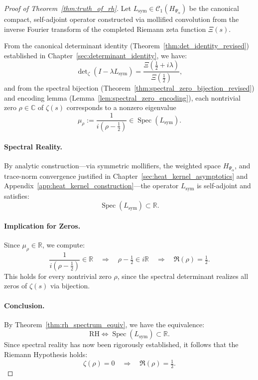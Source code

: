 \begin{proof}[Proof of Theorem~\ref{thm:truth_of_rh}]
Let \( L_{\mathrm{sym}} \in \mathcal{C}_1(H_{\Psi_\alpha}) \) be the canonical compact, self-adjoint operator constructed via mollified convolution from the inverse Fourier transform of the completed Riemann zeta function \( \Xi(s) \).

From the canonical determinant identity (Theorem~\ref{thm:det_identity_revised}) established in Chapter~\ref{sec:determinant_identity}, we have:
\[
\det\nolimits_\zeta(I - \lambda L_{\mathrm{sym}}) = \frac{\Xi\left( \tfrac{1}{2} + i\lambda \right)}{\Xi\left( \tfrac{1}{2} \right)},
\]
and from the spectral bijection (Theorem~\ref{thm:spectral_zero_bijection_revised}) and encoding lemma (Lemma~\ref{lem:spectral_zero_encoding}), each nontrivial zero \( \rho \in \mathbb{C} \) of \( \zeta(s) \) corresponds to a nonzero eigenvalue
\[
\mu_\rho := \frac{1}{i(\rho - \tfrac{1}{2})} \in \operatorname{Spec}(L_{\mathrm{sym}}).
\]

\paragraph{Spectral Reality.}
By analytic construction—via symmetric mollifiers, the weighted space \( H_{\Psi_\alpha} \), and trace-norm convergence justified in Chapter~\ref{sec:heat_kernel_asymptotics} and Appendix~\ref{app:heat_kernel_construction}—the operator \( L_{\mathrm{sym}} \) is self-adjoint and satisfies:
\[
\operatorname{Spec}(L_{\mathrm{sym}}) \subset \mathbb{R}.
\]

\paragraph{Implication for Zeros.}
Since \( \mu_\rho \in \mathbb{R} \), we compute:
\[
\frac{1}{i(\rho - \tfrac{1}{2})} \in \mathbb{R}
\quad \Longrightarrow \quad \rho - \tfrac{1}{2} \in i\mathbb{R}
\quad \Longrightarrow \quad \Re(\rho) = \tfrac{1}{2}.
\]
This holds for every nontrivial zero \( \rho \), since the spectral determinant realizes all zeros of \( \zeta(s) \) via bijection.

\paragraph{Conclusion.}
By Theorem~\ref{thm:rh_spectrum_equiv}, we have the equivalence:
\[
\mathrm{RH} \iff \operatorname{Spec}(L_{\mathrm{sym}}) \subset \mathbb{R}.
\]
Since spectral reality has now been rigorously established, it follows that the Riemann Hypothesis holds:
\[
\zeta(\rho) = 0 \quad \Rightarrow \quad \Re(\rho) = \tfrac{1}{2}.
\]
\end{proof}

